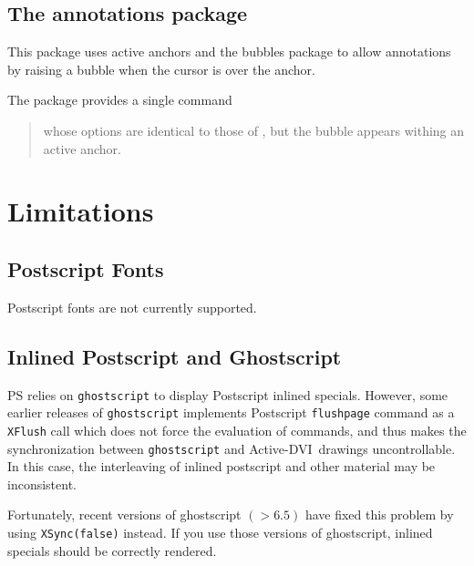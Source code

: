 \documentclass[12pt]{article}
\def \ActiveDVI {Active-DVI}
\begin{document}
\medskip \noindent
\docdef \setkeys{}

\subsection{The annotations package}

This package uses active anchors and the bubbles package to 
allow annotations by raising a bubble when the cursor is over the anchor.

The package provides a single command

\medskip\noindent
\docdef \adviannot {}%
\begin{quote}
whose options are identical to those of \docdef \bubble, but the bubble
appears withing an active anchor. 
\end{quote}


\appendix

\section {Limitations}

\subsection*{Postscript Fonts}

Postscript fonts are not currently supported. 

\subsection*{Inlined Postscript and Ghostscript}

PS relies on {\tt ghostscript} to display Postscript inlined specials.
However, some earlier releases of {\tt ghostscript} 
implements Postscript {\tt flushpage} command as a {\tt XFlush} call
which does not force the evaluation of commands, and thus makes the 
synchronization between {\tt ghostscript} and \ActiveDVI~drawings 
uncontrollable. In this case, the interleaving of inlined postscript 
and other material may be inconsistent. 

Fortunately, recent versions of ghostscript $(> 6.5)$ have
fixed this problem by using {\tt XSync(false)} instead.
If you use those versions of ghostscript, inlined specials should be
correctly rendered.
\end{document}
